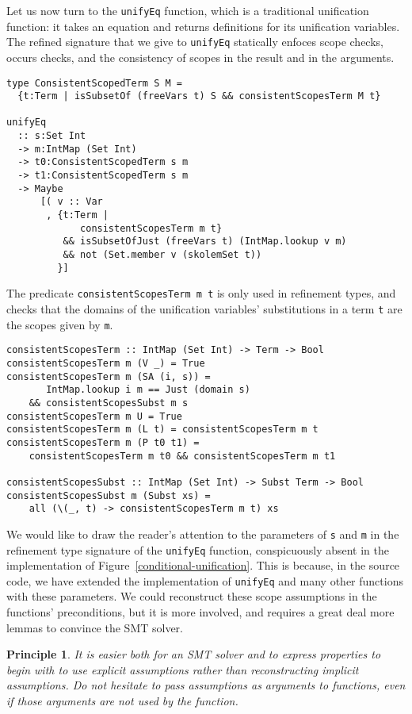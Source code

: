 \documentclass[sigconf, review]{acmart}
\newcommand{\tc}[1]{{\small\texttt{#1}}}
\newtheorem{principle}{Principle}
\begin{document}
Let us now turn to the \tc{unifyEq} function, which is a traditional unification
function: it takes an equation and returns definitions for its unification
variables.
The refined signature that we give to \tc{unifyEq} statically enfoces scope checks, occurs checks,
and the consistency of scopes in the result and in the arguments.

\begin{verbatim}
type ConsistentScopedTerm S M =
  {t:Term | isSubsetOf (freeVars t) S && consistentScopesTerm M t}

unifyEq
  :: s:Set Int
  -> m:IntMap (Set Int)
  -> t0:ConsistentScopedTerm s m
  -> t1:ConsistentScopedTerm s m
  -> Maybe
      [( v :: Var
       , {t:Term |
             consistentScopesTerm m t}
          && isSubsetOfJust (freeVars t) (IntMap.lookup v m)
          && not (Set.member v (skolemSet t))
         }]
\end{verbatim}

The predicate \tc{consistentScopesTerm m t} is only used in refinement types, and
checks that the domains of the unification variables' substitutions in a term
\tc{t} are the scopes given by \tc{m}.

\begin{verbatim}
consistentScopesTerm :: IntMap (Set Int) -> Term -> Bool
consistentScopesTerm m (V _) = True
consistentScopesTerm m (SA (i, s)) =
       IntMap.lookup i m == Just (domain s)
    && consistentScopesSubst m s
consistentScopesTerm m U = True
consistentScopesTerm m (L t) = consistentScopesTerm m t
consistentScopesTerm m (P t0 t1) =
    consistentScopesTerm m t0 && consistentScopesTerm m t1

consistentScopesSubst :: IntMap (Set Int) -> Subst Term -> Bool
consistentScopesSubst m (Subst xs) =
    all (\(_, t) -> consistentScopesTerm m t) xs
\end{verbatim}

We would like to draw the reader's attention to the parameters of \tc{s}
and \tc{m} in the refinement type signature of the \tc{unifyEq} function,
conspicuously absent in the implementation of
Figure~\ref{conditional-unification}. This is because, in the source code,
we have extended the implementation of \tc{unifyEq} and many other functions
with these parameters. We could reconstruct these scope assumptions in the
functions' preconditions, but it is more involved, and requires a great deal more
lemmas to convince the SMT solver.

\begin{principle}
  It is easier both for an SMT solver and to express properties to begin with to
  use explicit assumptions rather than reconstructing implicit assumptions.
  Do not hesitate to pass assumptions as arguments to functions, even if those
  arguments are not used by the function.
\end{principle}
\end{document}
